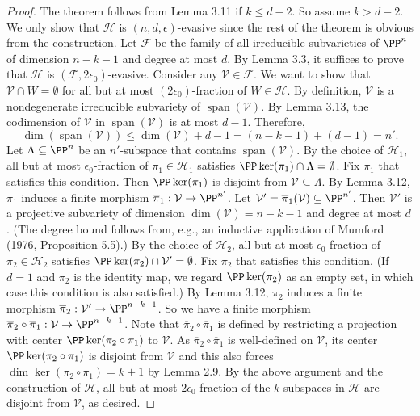 \begin{proof}
The theorem follows from Lemma 3.11 if $k\le d-2$. So assume $k>d-2$. We only show that $\mathcal H$ is $(n,d,\epsilon)$-evasive since the rest of the theorem is obvious from the construction.
Let $\mathcal F$ be the family of all irreducible subvarieties of $\PP^n$ of dimension $n-k-1$ and degree at most $d$. By Lemma 3.3, it suffices to prove that $\mathcal H$ is $(\mathcal F,2\epsilon_0)$-evasive. Consider any $\mathcal V\in\mathcal F$. We want to show that $\mathcal V\cap W=\emptyset$ for all but at most $(2\epsilon_0)$-fraction of $W\in\mathcal H$.
By definition, $\mathcal V$ is a nondegenerate irreducible subvariety of $\operatorname{span}(\mathcal V)$. By Lemma 3.13, the codimension of $\mathcal V$ in $\operatorname{span}(\mathcal V)$ is at most $d-1$. Therefore,
\[\dim(\operatorname{span}(\mathcal V))\le\dim(\mathcal V)+d-1=(n-k-1)+(d-1)=n'.\]
Let $\Lambda\subseteq\PP^n$ be an $n'$-subspace that contains $\operatorname{span}(\mathcal V)$. By the choice of $\mathcal H_1$, all but at most $\epsilon_0$-fraction of $\pi_1\in\mathcal H_1$ satisfies $\PP\ker(\pi_1)\cap\Lambda=\emptyset$. Fix $\pi_1$ that satisfies this condition. Then $\PP\ker(\pi_1)$ is disjoint from $\mathcal V\subseteq\Lambda$. By Lemma 3.12, $\pi_1$ induces a finite morphism $\overline\pi_1:\mathcal V\to\PP^{n'}$.
Let $\mathcal V'=\overline\pi_1(\mathcal V)\subseteq\PP^{n'}$. Then $\mathcal V'$ is a projective subvariety of dimension $\dim(\mathcal V)=n-k-1$ and degree at most $d$. (The degree bound follows from, e.g., an inductive application of Mumford (1976, Proposition 5.5).) By the choice of $\mathcal H_2$, all but at most $\epsilon_0$-fraction of $\pi_2\in\mathcal H_2$ satisfies $\PP\ker(\pi_2)\cap\mathcal V'=\emptyset$. Fix $\pi_2$ that satisfies this condition. (If $d=1$ and $\pi_2$ is the identity map, we regard $\PP\ker(\pi_2)$ as an empty set, in which case this condition is also satisfied.) By Lemma 3.12, $\pi_2$ induces a finite morphism $\overline\pi_2:\mathcal V'\to\PP^{n-k-1}$. So we have a finite morphism $\overline\pi_2\circ\overline\pi_1:\mathcal V\to\PP^{n-k-1}$. Note that $\overline\pi_2\circ\overline\pi_1$ is defined by restricting a projection with center $\PP\ker(\pi_2\circ\pi_1)$ to $\mathcal V$. As $\overline\pi_2\circ\overline\pi_1$ is well-defined on $\mathcal V$, its center $\PP\ker(\pi_2\circ\pi_1)$ is disjoint from $\mathcal V$ and this also forces $\dim\ker(\pi_2\circ\pi_1)=k+1$ by Lemma 2.9.
By the above argument and the construction of $\mathcal H$, all but at most $2\epsilon_0$-fraction of the $k$-subspaces in $\mathcal H$ are disjoint from $\mathcal V$, as desired.
\end{proof}
